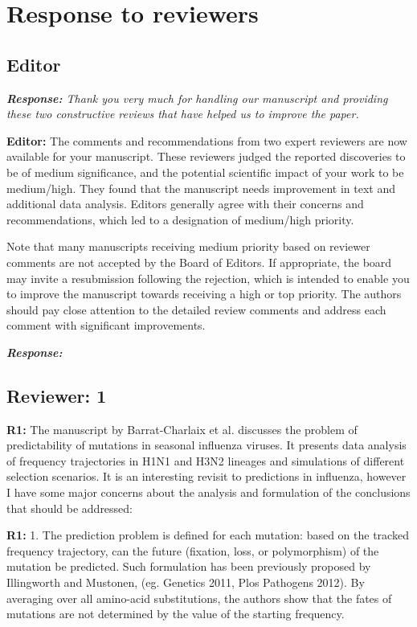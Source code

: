 \documentclass[aps,rmp,onecolumn]{revtex4-1}
\newcommand{\refa}[1]{\textbf{R1:} #1\vskip 5mm}
\newcommand{\editor}[1]{\textbf{Editor:} #1\vskip 5mm}
\newcommand{\response}[1]{{\it {\color{response}\textbf{Response:} #1}}\vskip 5mm}
\begin{document}
\section*{Response to reviewers}

\subsection*{Editor}

\response{
Thank you very much for handling our manuscript and providing these two constructive reviews that have helped us to improve the paper. 
}

\editor{The comments and recommendations from two expert reviewers are now available for your manuscript. These reviewers judged the reported discoveries to be of medium significance, and the potential scientific impact of your work to be medium/high. They found that the manuscript needs improvement in text and additional data analysis. Editors generally agree with their concerns and recommendations, which led to a designation of medium/high priority.  

Note that many manuscripts receiving medium priority based on reviewer comments are not accepted by the Board of Editors. If appropriate, the board may invite a resubmission following the rejection, which is intended to enable you to improve the manuscript towards receiving a high or top priority. The authors should pay close attention to the detailed review comments and address each comment with significant improvements.}

\response{}


\subsection*{Reviewer: 1}

\refa{The manuscript by Barrat-Charlaix et al. discusses the problem of
predictability of mutations in seasonal influenza viruses. It presents
data analysis of frequency trajectories in H1N1 and H3N2 lineages and
simulations of different selection scenarios.
It is an interesting revisit to predictions in influenza, however I
have some major concerns about the analysis and formulation of the
conclusions that should be addressed:}

\refa{1. The prediction problem is defined for each mutation: based on the
tracked frequency trajectory, can the future (fixation, loss, or
polymorphism) of the mutation be predicted. Such formulation has been
previously proposed by Illingworth and Mustonen, (eg. Genetics 2011,
Plos Pathogens 2012). By averaging over all amino-acid substitutions,
the authors show that the fates of mutations are not determined by the
value of the starting frequency.}
\end{document}
